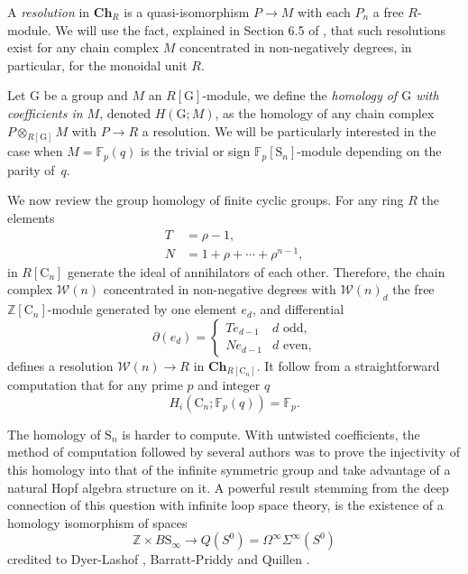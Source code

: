 \documentclass[A4]{amsart}
\theoremstyle{definition}
\newcommand{\Z}{\mathbb{Z}}
\begin{document}
A \textit{resolution} in $\mathbf{Ch}_R$ is a quasi-isomorphism $P \to M$ with each $P_n$ a free \mbox{$R$-module}. We will use the fact, explained in Section 6.5 of \cite{jacobson1989algebra}, that such resolutions exist for any chain complex $M$ concentrated in non-negatively degrees, in particular, for the monoidal unit $R$.

Let $\mathrm G$ be a group and $M$ an $R[\mathrm G]$-module, we define the \textit{homology of $\mathrm G$ with coefficients in $M$}, denoted $H(\mathrm G; M)$, as the homology of any chain complex $P \otimes_{R[\mathrm G]} M$ with $P \to R$ a resolution. We will be particularly interested in the case when $M = \mathbb F_p(q)$ is the trivial or sign $\mathbb F_p[\mathrm{S}_n]$-module depending on the parity of~$q$.

We now review the group homology of finite cyclic groups. For any ring $R$ the elements
\begin{align} \label{eq: T and R definition}
T &= \rho - 1, \\
N &= 1 + \rho + \cdots + \rho^{n-1},
\end{align}
in $R[\mathrm{C}_n]$ generate the ideal of annihilators of each other. Therefore, the chain complex $\mathcal W(n)$ concentrated in non-negative degrees with $\mathcal W(n)_d$ the free $\Z[\mathrm{C}_n]$-module generated by one element $e_d$, and differential
\begin{equation*}
\partial(e_d) = \begin{cases}
Te_{d-1} & d \text{ odd,} \\
Ne_{d-1} & d \text{ even,}
\end{cases}
\end{equation*}
defines a resolution $\mathcal W(n) \to R$ in $\mathbf{Ch}_{R[\mathrm{C}_n]}$. It follow from a straightforward computation that for any prime $p$ and integer $q$
\begin{equation*}
H_i(\mathrm{C}_n; \mathbb{F}_p(q)) = \mathbb{F}_p.
\end{equation*}

The homology of $\mathrm{S}_n$ is harder to compute. With untwisted coefficients, the method of computation followed by several authors was to prove the injectivity of this homology into that of the infinite symmetric group and take advantage of a natural Hopf algebra structure on it. A powerful result stemming from the deep connection of this question with infinite loop space theory, is the existence of a homology isomorphism of spaces
\begin{equation*}
\Z \times B\mathrm{S}_\infty \to Q(S^0) = \Omega^\infty \Sigma^\infty (S^0)
\end{equation*}
credited to Dyer-Lashof \cite{dyer62lashof}, Barratt-Priddy and Quillen \cite{barratt1972priddy}.
\end{document}
